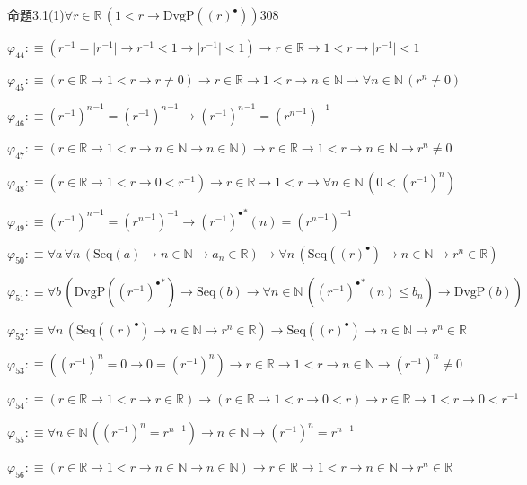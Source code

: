 \begin{fullproof}{命題3.1(1)}{$\forall r \in \mathbb{R}\,(1 < r \to \mathrm{DvgP}({(r)^{\bullet}}))$}{308}
\begin{abbrevlist}
\item $\varphi_{44} :\equiv (r^{-1} = \lvert r^{-1} \rvert \to r^{-1} < 1 \to \lvert r^{-1} \rvert < 1) \to r \in \mathbb{R} \to 1 < r \to \lvert r^{-1} \rvert < 1$
\item $\varphi_{45} :\equiv (r \in \mathbb{R} \to 1 < r \to r \neq 0) \to r \in \mathbb{R} \to 1 < r \to n \in \mathbb{N} \to \forall n \in \mathbb{N}\,({{r}^{n}} \neq 0)$
\item $\varphi_{46} :\equiv {{(r^{-1})}^{n}}^{-1} = {{(r^{-1})}^{n}}^{-1} \to {{(r^{-1})}^{n}}^{-1} = ({{r}^{n}}^{-1})^{-1}$
\item $\varphi_{47} :\equiv (r \in \mathbb{R} \to 1 < r \to n \in \mathbb{N} \to n \in \mathbb{N}) \to r \in \mathbb{R} \to 1 < r \to n \in \mathbb{N} \to {{r}^{n}} \neq 0$
\item $\varphi_{48} :\equiv (r \in \mathbb{R} \to 1 < r \to 0 < r^{-1}) \to r \in \mathbb{R} \to 1 < r \to \forall n \in \mathbb{N}\,(0 < {{(r^{-1})}^{n}})$
\item $\varphi_{49} :\equiv {{(r^{-1})}^{n}}^{-1} = ({{r}^{n}}^{-1})^{-1} \to {(r^{-1})^{\bullet}}^{\ast}(n) = ({{r}^{n}}^{-1})^{-1}$
\item $\varphi_{50} :\equiv \forall a\,\forall n\,(\mathrm{Seq}(a) \to n \in \mathbb{N} \to a_{n} \in \mathbb{R}) \to \forall n\,(\mathrm{Seq}({(r)^{\bullet}}) \to n \in \mathbb{N} \to {{r}^{n}} \in \mathbb{R})$
\item $\varphi_{51} :\equiv \forall b\,(\mathrm{DvgP}({(r^{-1})^{\bullet}}^{\ast}) \to \mathrm{Seq}(b) \to \forall n \in \mathbb{N}\,({(r^{-1})^{\bullet}}^{\ast}(n) \leq b_{n}) \to \mathrm{DvgP}(b))$
\item $\varphi_{52} :\equiv \forall n\,(\mathrm{Seq}({(r)^{\bullet}}) \to n \in \mathbb{N} \to {{r}^{n}} \in \mathbb{R}) \to \mathrm{Seq}({(r)^{\bullet}}) \to n \in \mathbb{N} \to {{r}^{n}} \in \mathbb{R}$
\item $\varphi_{53} :\equiv ({{(r^{-1})}^{n}} = 0 \to 0 = {{(r^{-1})}^{n}}) \to r \in \mathbb{R} \to 1 < r \to n \in \mathbb{N} \to {{(r^{-1})}^{n}} \neq 0$
\item $\varphi_{54} :\equiv (r \in \mathbb{R} \to 1 < r \to r \in \mathbb{R}) \to (r \in \mathbb{R} \to 1 < r \to 0 < r) \to r \in \mathbb{R} \to 1 < r \to 0 < r^{-1}$
\item $\varphi_{55} :\equiv \forall n \in \mathbb{N}\,({{(r^{-1})}^{n}} = {{r}^{n}}^{-1}) \to n \in \mathbb{N} \to {{(r^{-1})}^{n}} = {{r}^{n}}^{-1}$
\item $\varphi_{56} :\equiv (r \in \mathbb{R} \to 1 < r \to n \in \mathbb{N} \to n \in \mathbb{N}) \to r \in \mathbb{R} \to 1 < r \to n \in \mathbb{N} \to {{r}^{n}} \in \mathbb{R}$

\end{abbrevlist}
\end{fullproof}
